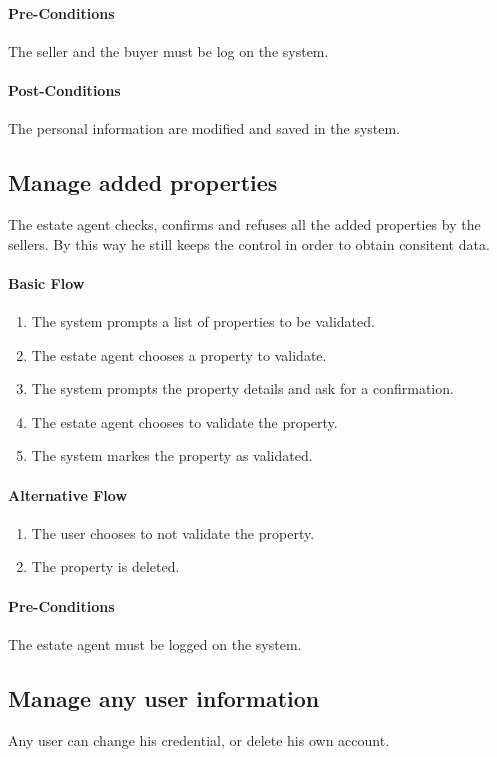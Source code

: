 \documentclass[a4paper,12pt]{article}
\begin{document}
\paragraph{Pre-Conditions}
The seller and the buyer must be log on the system.
\paragraph{Post-Conditions}
The personal information are modified and saved in the system.

\subsection{Manage added properties}
The estate agent checks, confirms and refuses all the added properties by the sellers. By this way he still keeps the control in order to obtain consitent data.
\paragraph{Basic Flow}
\begin{enumerate}
\item The system prompts a list of properties to be validated.
\item The estate agent chooses a property to validate.
\item The system prompts the property details and ask for a confirmation.
\item The estate agent chooses to validate the property.
\item The system markes the property as validated.
\end{enumerate}
\paragraph{Alternative Flow}
\begin{enumerate}
\item The user chooses to not validate the property.
\item The property is deleted.
\end{enumerate}
\paragraph{Pre-Conditions}
The estate agent must be logged on the system.


\subsection{Manage any user information}
Any user can change his credential, or delete his own account.
\end{document}

